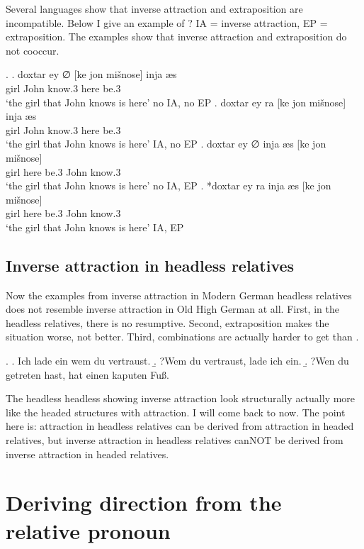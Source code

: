 Several languages show that inverse attraction and extraposition are incompatible. Below I give an example of ? IA = inverse attraction, EP = extraposition. The examples show that inverse attraction and extraposition do not cooccur.

\ex.
\ag. doxtar ey ∅ [ke jon mišnose] inja æs\\
girl    John know.3 here be.3\\
`the girl that John knows is here' \hfill no IA, no EP
\bg. doxtar ey ra [ke jon mišnose] inja æs\\
girl    John know.3 here be.3\\
`the girl that John knows is here' \hfill IA, no EP
\bg. doxtar ey ∅ inja æs [ke jon mišnose]\\
girl   here be.3  John know.3\\
`the girl that John knows is here' \hfill no IA, EP
\bg. *doxtar ey ra inja æs [ke jon mišnose]\\
girl   here be.3  John know.3\\
`the girl that John knows is here' \hfill IA, EP

\subsection{Inverse attraction in headless relatives}

Now the examples from inverse attraction in Modern German headless relatives does not resemble inverse attraction in Old High German at all. First, in the headless relatives, there is no resumptive. Second, extraposition makes the situation worse, not better. Third,  combinations are actually harder to get than .

\ex. \a. Ich lade ein wem du vertraust.
\b. ?Wem du vertraust, lade ich ein.
\b. ?Wen du getreten hast, hat einen kaputen Fuß.

The headless headless showing inverse attraction look structurally actually more like the headed structures with attraction. I will come back to now. The point here is: attraction in headless relatives can be derived from attraction in headed relatives, but inverse attraction in headless relatives canNOT be derived from inverse attraction in headed relatives.




\section{Deriving direction from the relative pronoun}

